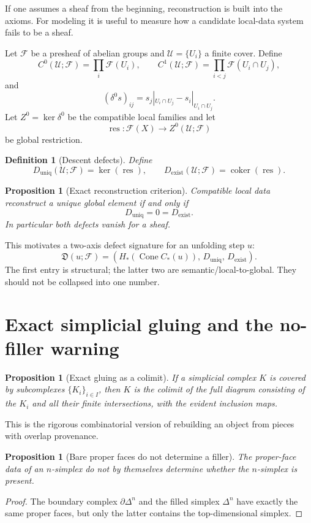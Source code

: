 \documentclass[11pt]{article}
\newtheorem{proposition}[theorem]{Proposition}
\newtheorem{definition}[theorem]{Definition}
\newcommand{\Cone}{\operatorname{Cone}}
\newcommand{\coker}{\operatorname{coker}}
\begin{document}
If one assumes a sheaf from the beginning, reconstruction is built into the axioms.  For modeling it is useful to measure how a candidate local-data system fails to be a sheaf.

Let $\mathcal F$ be a presheaf of abelian groups and $\mathcal U=\{U_i\}$ a finite cover.  Define
\[
C^0(\mathcal U;\mathcal F)=\prod_i\mathcal F(U_i),\qquad
C^1(\mathcal U;\mathcal F)=\prod_{i<j}\mathcal F(U_i\cap U_j),
\]
and
\[
(\delta^0s)_{ij}=s_j|_{U_i\cap U_j}-s_i|_{U_i\cap U_j}.
\]
Let $Z^0=\ker\delta^0$ be the compatible local families and let
\[
\operatorname{res}:\mathcal F(X)\to Z^0(\mathcal U;\mathcal F)
\]
be global restriction.

\begin{definition}[Descent defects]
Define
\[
D_{\mathrm{uniq}}(\mathcal U;\mathcal F)=\ker(\operatorname{res}),
\qquad
D_{\mathrm{exist}}(\mathcal U;\mathcal F)=\coker(\operatorname{res}).
\]
\end{definition}

\begin{proposition}[Exact reconstruction criterion]
Compatible local data reconstruct a unique global element if and only if
\[
D_{\mathrm{uniq}}=0=D_{\mathrm{exist}}.
\]
In particular both defects vanish for a sheaf.
\end{proposition}

This motivates a two-axis defect signature for an unfolding step $u$:
\[
\mathfrak D(u;\mathcal F)
=\left(
H_*(\Cone C_*(u)),\,
D_{\mathrm{uniq}},\,
D_{\mathrm{exist}}
\right).
\]
The first entry is structural; the latter two are semantic/local-to-global.  They should not be collapsed into one number.

\section{Exact simplicial gluing and the no-filler warning}

\begin{proposition}[Exact gluing as a colimit]
If a simplicial complex $K$ is covered by subcomplexes $\{K_i\}_{i\in I}$, then $K$ is the colimit of the full diagram consisting of the $K_i$ and all their finite intersections, with the evident inclusion maps.
\end{proposition}

This is the rigorous combinatorial version of rebuilding an object from pieces with overlap provenance.

\begin{proposition}[Bare proper faces do not determine a filler]
The proper-face data of an $n$-simplex do not by themselves determine whether the $n$-simplex is present.
\end{proposition}
\begin{proof}
The boundary complex $\partial\Delta^n$ and the filled simplex $\Delta^n$ have exactly the same proper faces, but only the latter contains the top-dimensional simplex.
\end{proof}
\end{document}
